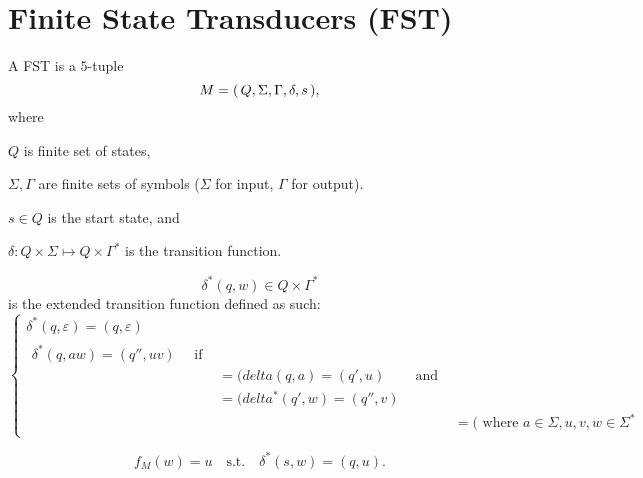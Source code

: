 \section{Finite State Transducers (FST)}

\begin{definition}
    A FST is a $5$-tuple
    \[
        M = { \left(\, Q,\Sigma,\Gamma,\delta,s \,\right) }
    ,\]
    where
    \begin{compactitem}
    \item $Q$ is finite set of states,
    \item $\Sigma, \Gamma$ are finite sets of symbols 
            ($\Sigma$ for input, $\Gamma$ for output).
    \item $s \in Q$ is the start state, and
    \item $\delta \colon Q \times \Sigma \mapsto Q \times \Gamma^*$
        is the transition function.
    \end{compactitem}
\end{definition}

\begin{definition}
    \[ 
    \delta^*(q,w) \in Q \times \Gamma^*
    \]
    is the extended transition function defined as such:
    \[
        \begin{cases}
            \delta^*(q,\varepsilon) = (q,\varepsilon) \\
            \begin{matrix}
                \delta^*(q,aw)  =  (q'',uv) \quad \text{ if } \\
                              & =  (delta(q,a)    = (q',u) & \text{ and } \\
                              & =  (delta^*(q',w) = (q'',v) \\
                              & & &=  (\text{ where $a \in \Sigma, u,v,w \in \Sigma^*$}
            \end{matrix}
        \end{cases}
    \]
\end{definition}

\[
    f_M(w) = u \quad\text{s.t.}\quad \delta^*(s,w) = (q,u)
.\]
